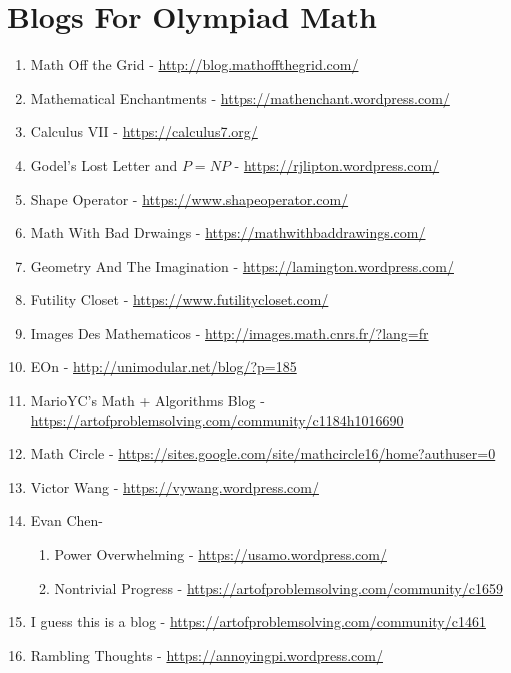 \documentclass{article}
\begin{document}
\section*{Blogs For Olympiad Math}

\begin{enumerate}
\item Math Off the Grid - \url{http://blog.mathoffthegrid.com/}
\item Mathematical Enchantments - \url{https://mathenchant.wordpress.com/}
\item Calculus VII - \url{https://calculus7.org/}
\item Godel's Lost Letter and $P=NP$ - \url{https://rjlipton.wordpress.com/}
\item Shape Operator - \url{https://www.shapeoperator.com/}
\item Math With Bad Drwaings - \url{https://mathwithbaddrawings.com/}
\item Geometry And The Imagination - \url{https://lamington.wordpress.com/}
\item Futility Closet - \url{https://www.futilitycloset.com/}
\item Images Des Mathematicos - \url{http://images.math.cnrs.fr/?lang=fr}
\item EOn - \url{http://unimodular.net/blog/?p=185}
\item MarioYC's Math + Algorithms Blog - \url{https://artofproblemsolving.com/community/c1184h1016690}
\item Math Circle - \url{https://sites.google.com/site/mathcircle16/home?authuser=0}
\item Victor Wang - \url{https://vywang.wordpress.com/}
\item Evan Chen-
\begin{enumerate}
\item Power Overwhelming - \url{https://usamo.wordpress.com/}
\item Nontrivial Progress - \url{https://artofproblemsolving.com/community/c1659}
\end{enumerate}
\item I guess this is a blog - \url{https://artofproblemsolving.com/community/c1461}
\item Rambling Thoughts - \url{https://annoyingpi.wordpress.com/}

\end{enumerate}
\end{document}
